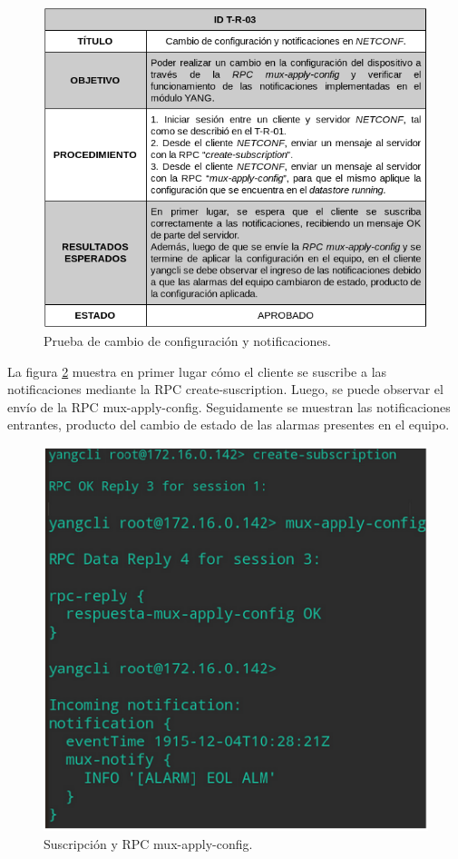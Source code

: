 \begin{figure}[H]
	\centering
	\includegraphics[scale=0.6]{Figures/test3.png}
	\caption{Prueba de cambio de configuración y notificaciones.}
	\label{fig:test3}
  \end{figure}

  La figura \ref{fig:test3_consulta} muestra en primer lugar cómo el cliente se suscribe a las notificaciones mediante la RPC create-suscription. Luego, se puede observar el envío de la RPC mux-apply-config. Seguidamente se muestran las notificaciones entrantes, producto del cambio de estado de las alarmas presentes en el equipo.
  
  \begin{figure}[H]
	\centering
	\includegraphics[scale=0.6]{Figures/test3_consulta.png}
	\caption{Suscripción y RPC mux-apply-config.}
	\label{fig:test3_consulta}
  \end{figure}



